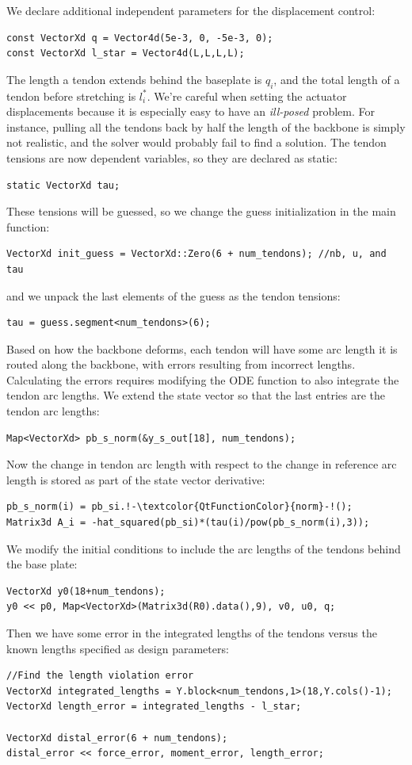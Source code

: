 \documentclass[12pt]{article}
\begin{document}
We declare additional independent parameters for the displacement control:
\begin{lstlisting}
const VectorXd q = Vector4d(5e-3, 0, -5e-3, 0);
const VectorXd l_star = Vector4d(L,L,L,L);
\end{lstlisting}
The length a tendon extends behind the baseplate is $q_i$, and the total length of a tendon before stretching is $l_i^*$. We're careful when setting the actuator displacements because it is especially easy to have an \emph{ill-posed} problem. For instance, pulling all the tendons back by half the length of the backbone is simply not realistic, and the solver would probably fail to find a solution.
The tendon tensions are now dependent variables, so they are declared as static:
\begin{lstlisting}
static VectorXd tau;
\end{lstlisting}
These tensions will be guessed, so we change the guess initialization in the main function:
\begin{lstlisting}
VectorXd init_guess = VectorXd::Zero(6 + num_tendons); //nb, u, and tau
\end{lstlisting}
and we unpack the last elements of the guess as the tendon tensions:
\begin{lstlisting}
tau = guess.segment<num_tendons>(6);
\end{lstlisting}
Based on how the backbone deforms, each tendon will have some arc length it is routed along the backbone, with errors resulting from incorrect lengths. Calculating the errors requires modifying the ODE function to also integrate the tendon arc lengths. We extend the state vector so that the last entries are the tendon arc lengths: 
\begin{lstlisting}
Map<VectorXd> pb_s_norm(&y_s_out[18], num_tendons);
\end{lstlisting}
Now the change in tendon arc length with respect to the change in reference arc length is stored as part of the state vector derivative:
\begin{lstlisting}
pb_s_norm(i) = pb_si.!-\textcolor{QtFunctionColor}{norm}-!();
Matrix3d A_i = -hat_squared(pb_si)*(tau(i)/pow(pb_s_norm(i),3));
\end{lstlisting}
We modify the initial conditions to include the arc lengths of the tendons behind the base plate:
\begin{lstlisting}
VectorXd y0(18+num_tendons);
y0 << p0, Map<VectorXd>(Matrix3d(R0).data(),9), v0, u0, q;
\end{lstlisting}
Then we have some error in the integrated lengths of the tendons versus the known lengths specified as design parameters:
\begin{lstlisting}
//Find the length violation error
VectorXd integrated_lengths = Y.block<num_tendons,1>(18,Y.cols()-1);
VectorXd length_error = integrated_lengths - l_star;

VectorXd distal_error(6 + num_tendons);
distal_error << force_error, moment_error, length_error;
\end{lstlisting}
\end{document}

